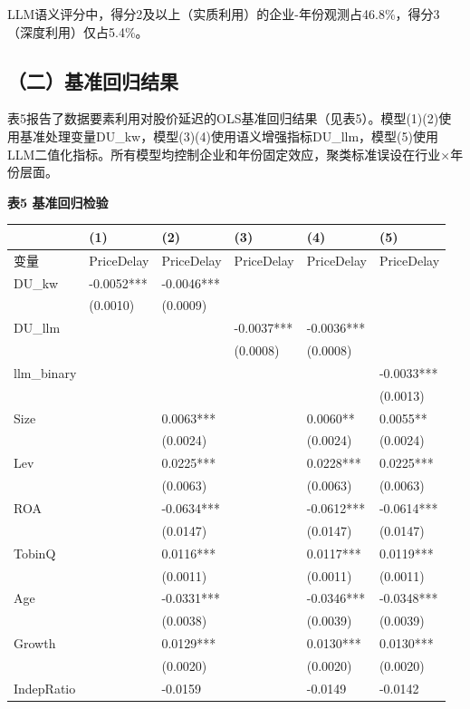 LLM语义评分中，得分2及以上（实质利用）的企业-年份观测占46.8\%，得分3（深度利用）仅占5.4\%。

\subsection{（二）基准回归结果}\label{ux4e8cux57faux51c6ux56deux5f52ux7ed3ux679c}

表5报告了数据要素利用对股价延迟的OLS基准回归结果（见表5）。模型(1)(2)使用基准处理变量DU\_kw，模型(3)(4)使用语义增强指标DU\_llm，模型(5)使用LLM二值化指标。所有模型均控制企业和年份固定效应，聚类标准误设在行业×年份层面。

\textbf{表5 基准回归检验}

{\def\LTcaptype{} %
\begin{longtable}[]{@{}llllll@{}}
\toprule\noalign{}
& (1) & (2) & (3) & (4) & (5) \\
\midrule\noalign{}
\endhead
\bottomrule\noalign{}
\endlastfoot
变量 & PriceDelay & PriceDelay & PriceDelay & PriceDelay & PriceDelay \\
DU\_kw & -0.0052*** & -0.0046*** & & & \\
& (0.0010) & (0.0009) & & & \\
DU\_llm & & & -0.0037*** & -0.0036*** & \\
& & & (0.0008) & (0.0008) & \\
llm\_binary & & & & & -0.0033*** \\
& & & & & (0.0013) \\
Size & & 0.0063*** & & 0.0060** & 0.0055** \\
& & (0.0024) & & (0.0024) & (0.0024) \\
Lev & & 0.0225*** & & 0.0228*** & 0.0225*** \\
& & (0.0063) & & (0.0063) & (0.0063) \\
ROA & & -0.0634*** & & -0.0612*** & -0.0614*** \\
& & (0.0147) & & (0.0147) & (0.0147) \\
TobinQ & & 0.0116*** & & 0.0117*** & 0.0119*** \\
& & (0.0011) & & (0.0011) & (0.0011) \\
Age & & -0.0331*** & & -0.0346*** & -0.0348*** \\
& & (0.0038) & & (0.0039) & (0.0039) \\
Growth & & 0.0129*** & & 0.0130*** & 0.0130*** \\
& & (0.0020) & & (0.0020) & (0.0020) \\
IndepRatio & & -0.0159 & & -0.0149 & -0.0142 \\

\end{longtable}}
